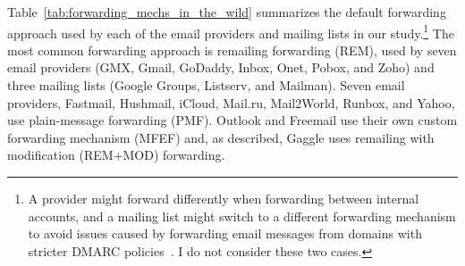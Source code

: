 

Table~\ref{tab:forwarding_mechs_in_the_wild} summarizes the default forwarding approach used by each of the email providers and mailing lists in our study.\footnote{A provider might forward differently when forwarding between internal accounts, and a mailing list might switch to a different forwarding mechanism to avoid issues caused by forwarding email messages from domains with stricter DMARC policies~\cite{spamreso59:online}. I do not consider these two cases.}
%
%
The most common forwarding approach is remailing forwarding (REM),
used by seven email providers (GMX, Gmail, GoDaddy, Inbox, Onet, Pobox, and Zoho) and
three mailing lists (Google Groups, Listserv, and Mailman). Seven email providers, Fastmail, Hushmail, iCloud, Mail.ru, Mail2World, Runbox, and Yahoo, use
plain-message forwarding (PMF).
Outlook and Freemail use their own custom
forwarding mechanism (MFEF) and, as described, Gaggle uses remailing with modification (REM+MOD)
forwarding.
